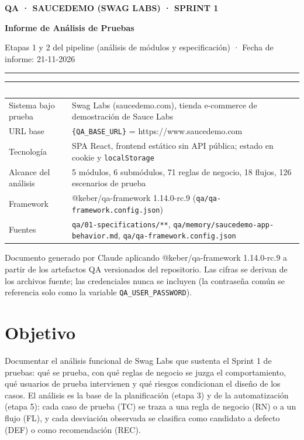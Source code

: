 \documentclass[10pt,a4paper]{article}
\newcommand{\tabhead}{\rowcolor{primary}}
\newcommand{\hcell}[1]{\textcolor{white}{\bfseries #1}}
\newcommand{\zebrarows}{\rowcolors{2}{zebra}{white}}
\newcommand{\reportcover}[3]{%
  \thispagestyle{first}%
  {\color{primary}\small\bfseries #1}\par\vspace{4pt}
  {\raggedright\fontsize{22}{28}\selectfont\bfseries\color{ink} #2\par}\vspace{6pt}
  {\small\color{muted} #3}\par\vspace{6pt}
  {\color{primary}\rule{\textwidth}{1pt}}\par
}
\begin{document}
\small

\reportcover
  {QA · SAUCEDEMO (SWAG LABS) · SPRINT 1}
  {Informe de Análisis de Pruebas}
  {Etapas 1 y 2 del pipeline (análisis de módulos y especificación) · Fecha de informe: 21-11-2026}

{\zebrarows
\begin{tabularx}{\textwidth}{|L{0.24\textwidth}|Y|}
\hline
\tabhead \hcell{Campo} & \hcell{Valor} \\ \hline
Sistema bajo prueba & Swag Labs (saucedemo.com), tienda e-commerce de demostración de Sauce Labs \\ \hline
URL base & \texttt{\{QA\_BASE\_URL\}} = https://www.saucedemo.com \\ \hline
Tecnología & SPA React, frontend estático sin API pública; estado en cookie y \texttt{localStorage} \\ \hline
Alcance del análisis & 5 módulos, 6 submódulos, 71 reglas de negocio, 18 flujos, 126 escenarios de prueba \\ \hline
Framework & @keber/qa-framework 1.14.0-rc.9 (\texttt{qa/qa-framework.config.json}) \\ \hline
Fuentes & \texttt{qa/01-specifications/**}, \texttt{qa/memory/saucedemo-app-behavior.md}, \texttt{qa/qa-framework.config.json} \\ \hline
\end{tabularx}}

\begin{infonote}
Documento generado por Claude aplicando @keber/qa-framework 1.14.0-rc.9 a partir de los artefactos QA versionados del repositorio. Las cifras se derivan de los archivos fuente; las credenciales nunca se incluyen (la contraseña común se referencia solo como la variable \texttt{QA\_USER\_PASSWORD}).
\end{infonote}

\section{Objetivo}
Documentar el análisis funcional de Swag Labs que sustenta el Sprint 1 de pruebas: qué se prueba, con qué reglas de negocio se juzga el comportamiento, qué usuarios de prueba intervienen y qué riesgos condicionan el diseño de los casos. El análisis es la base de la planificación (etapa 3) y de la automatización (etapa 5): cada caso de prueba (TC) se traza a una regla de negocio (RN) o a un flujo (FL), y cada desviación observada se clasifica como candidato a defecto (DEF) o como recomendación (REC).
\end{document}
